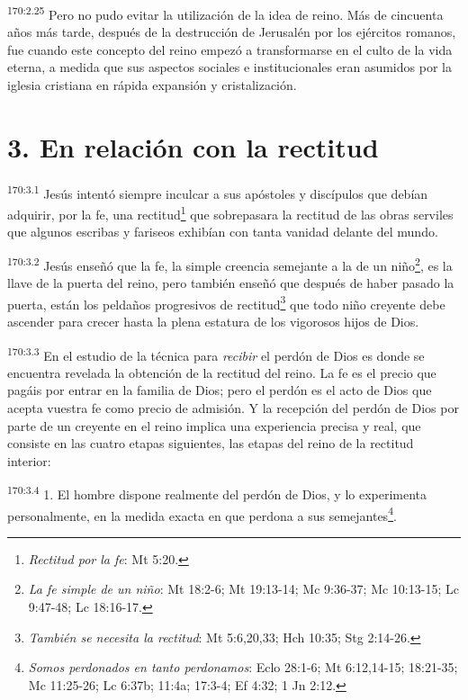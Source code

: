 \par
\textsuperscript{170:2.25} Pero no pudo evitar la utilización de la idea de reino. Más de cincuenta años más tarde, después de la destrucción de Jerusalén por los ejércitos romanos, fue cuando este concepto del reino empezó a transformarse en el culto de la vida eterna, a medida que sus aspectos sociales e institucionales eran asumidos por la iglesia cristiana en rápida expansión y cristalización.

\section*{3. En relación con la rectitud}
\par
\textsuperscript{170:3.1} Jesús intentó siempre inculcar a sus apóstoles y discípulos que debían adquirir, por la fe, una rectitud\footnote{\textit{Rectitud por la fe}: Mt 5:20.} que sobrepasara la rectitud de las obras serviles que algunos escribas y fariseos exhibían con tanta vanidad delante del mundo.

\par
\textsuperscript{170:3.2} Jesús enseñó que la fe, la simple creencia semejante a la de un niño\footnote{\textit{La fe simple de un niño}: Mt 18:2-6; Mt 19:13-14; Mc 9:36-37; Mc 10:13-15; Lc 9:47-48; Lc 18:16-17.}, es la llave de la puerta del reino, pero también enseñó que después de haber pasado la puerta, están los peldaños progresivos de rectitud\footnote{\textit{También se necesita la rectitud}: Mt 5:6,20,33; Hch 10:35; Stg 2:14-26.} que todo niño creyente debe ascender para crecer hasta la plena estatura de los vigorosos hijos de Dios.

\par
\textsuperscript{170:3.3} En el estudio de la técnica para \textit{recibir} el perdón de Dios es donde se encuentra revelada la obtención de la rectitud del reino. La fe es el precio que pagáis por entrar en la familia de Dios; pero el perdón es el acto de Dios que acepta vuestra fe como precio de admisión. Y la recepción del perdón de Dios por parte de un creyente en el reino implica una experiencia precisa y real, que consiste en las cuatro etapas siguientes, las etapas del reino de la rectitud interior:

\par
\textsuperscript{170:3.4} 1. El hombre dispone realmente del perdón de Dios, y lo experimenta personalmente, en la medida exacta en que perdona a sus semejantes\footnote{\textit{Somos perdonados en tanto perdonamos}: Eclo 28:1-6; Mt 6:12,14-15; 18:21-35; Mc 11:25-26; Lc 6:37b; 11:4a; 17:3-4; Ef 4:32; 1 Jn 2:12.}.


